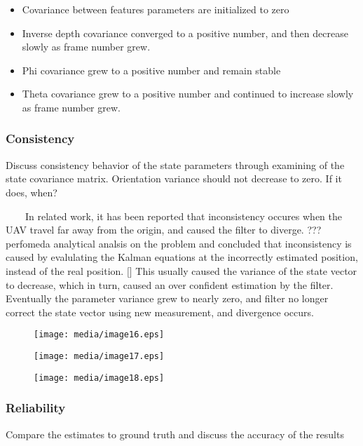\begin{itemize}
\item Covariance between features parameters are initialized to zero
\item Inverse depth covariance converged to a positive number, and then 
decrease slowly as frame number grew.
\item Phi covariance grew to a positive number and remain stable
\item Theta covariance grew to a positive number and continued to 
increase slowly as frame number grew. 
\end{itemize}
\newpage


\subsubsection{Consistency}
Discuss consistency behavior of the state parameters through examining 
of the state covariance matrix. Orientation variance should not decrease 
to zero. If it does, when?

\ \ \ \ In related work, it has been reported that inconsistency occures 
when the UAV travel far away from the origin, and caused the filter to 
diverge. ??? perfomeda analytical analsis on the problem and concluded 
that inconsistency is caused by evalulating the Kalman equations at the 
incorrectly estimated position, instead of the real position. $[$$]$ 
This usually caused the variance of the state vector to decrease, which 
in turn, caused an over confident estimation by the filter. Eventually 
the parameter variance grew to nearly zero, and filter no longer correct 
the state vector using new measurement, and divergence occurs. 

\begin{figure}[h]
\centering
\texttt{[image: media/image16.eps]}
\end{figure}




\begin{figure}[h]
\centering
\texttt{[image: media/image17.eps]}
\end{figure}


\begin{figure}[h]
\centering
\texttt{[image: media/image18.eps]}
\end{figure}




\newpage


\subsubsection{Reliability}
Compare the estimates to ground truth and discuss the accuracy of the 
results

